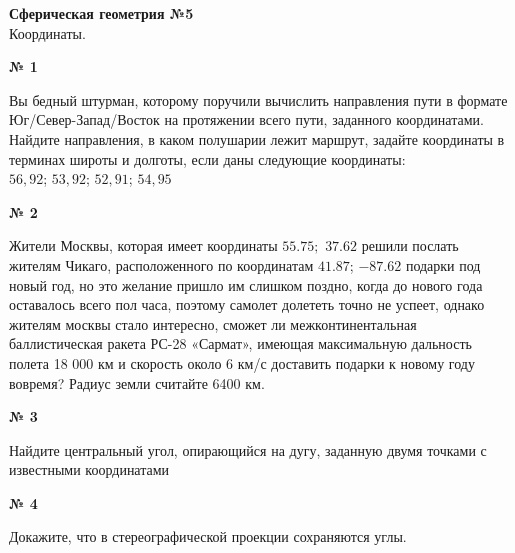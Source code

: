 


    \begin{center}
        \textbf{Сферическая геометрия №5}\\
        Координаты.
    \end{center}

    \begin{center}
        \textbf{№ 1}
    \end{center}

    Вы бедный штурман, которому поручили вычислить направления пути в формате Юг/Север-Запад/Восток
    на протяжении всего пути, заданного координатами.
    Найдите направления, в каком полушарии лежит маршрут, задайте координаты в терминах широты и долготы, если даны следующие координаты:\\
    $56, 92$; $53, 92$; $52, 91$; $54, 95$

    \begin{center}
        \textbf{№ 2}
    \end{center}

    Жители Москвы, которая имеет координаты $55.75;$ $37.62$ решили послать
    жителям Чикаго, расположенного по координатам $41.87$; $-87.62$ подарки под новый год,
    но это желание пришло им слишком поздно, когда до нового года оставалось всего пол часа,
    поэтому самолет долететь точно не успеет, однако жителям москвы стало интересно,
    сможет ли межконтинентальная баллистическая ракета РС-28 «Сармат», имеющая максимальную дальность
    полета 18 000 км и скорость около 6 км/с доставить подарки к новому году вовремя?
    Радиус земли считайте 6400 км.

    \begin{center}
        \textbf{№ 3}
    \end{center}

    Найдите центральный угол, опирающийся на дугу, заданную двумя точками с известными координатами

    \begin{center}
        \textbf{№ 4}
    \end{center}

    Докажите, что в стереографической проекции сохраняются углы.


